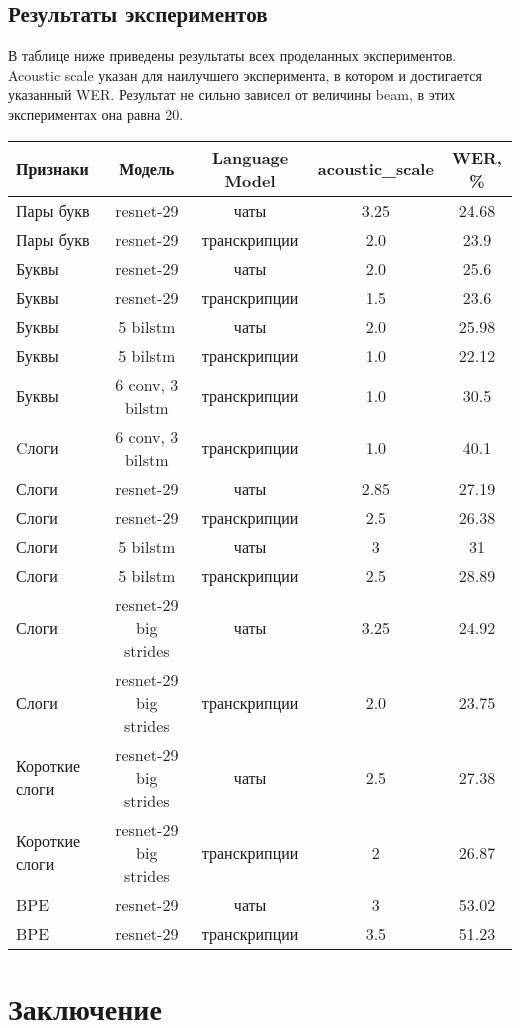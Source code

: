 \documentclass[a4paper,14pt]{extarticle}
\begin{document}
\subsection{Результаты экспериментов}
В таблице ниже приведены результаты всех проделанных экспериментов. Acoustic scale указан для наилучшего эксперимента, в котором и достигается указанный WER. Результат не сильно зависел от величины beam, в этих экспериментах она равна 20.
\\
\begin{tabularx}{1.05\textwidth}{| p{2cm} | c | c | c | c |}
	\hline
	Признаки & Модель & Language Model & acoustic\_scale & WER, \% \\
	\hline
 	Пары букв & resnet-29 & чаты & 3.25 &  24.68 \\
	Пары букв & resnet-29 & транскрипции & 2.0 &  23.9 \\
	Буквы & resnet-29 & чаты & 2.0 &  25.6 \\
	Буквы & resnet-29 & транскрипции & 1.5 &  23.6 \\
	Буквы & 5 bilstm & чаты & 2.0 &  25.98 \\
	Буквы & 5 bilstm & транскрипции & 1.0 &  22.12 \\
	Буквы & 6 conv, 3 bilstm & транскрипции & 1.0 &  30.5 \\
	Cлоги & 6 conv, 3 bilstm & транскрипции & 1.0 &  40.1 \\
	Слоги & resnet-29 & чаты & 2.85 &  27.19 \\
	Слоги & resnet-29 & транскрипции & 2.5 &  26.38 \\
	Слоги & 5 bilstm & чаты & 3 &  31 \\
	Слоги & 5 bilstm & транскрипции & 2.5 &  28.89 \\
	Слоги & resnet-29 big strides & чаты & 3.25 &  24.92 \\
	Слоги & resnet-29 big strides & транскрипции & 2.0 &  23.75 \\
	Короткие слоги & resnet-29 big strides & чаты & 2.5 &  27.38 \\
	Короткие слоги & resnet-29 big strides & транскрипции & 2 &  26.87 \\
	BPE & resnet-29 & чаты & 3 & 53.02 \\ 
	BPE & resnet-29 & транскрипции & 3.5 & 51.23 \\ 
	\hline
\end{tabularx}
\pagebreak
\section{Заключение}
\end{document}
